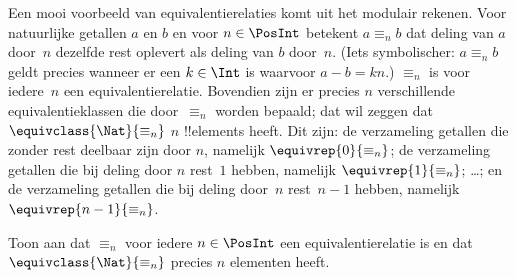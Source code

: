 \documentclass[../../../include/open-logic-section]{subfiles}
\begin{document}
\begin{ex}
Een mooi voorbeeld van equivalentierelaties komt uit het modulair rekenen.
Voor natuurlijke getallen $a$ en $b$ en voor $n \in \PosInt$ betekent
$a \equiv_n b$ dat
deling van $a$ door~$n$ dezelfde rest oplevert als deling van $b$ door~$n$.
(Iets symbolischer: $a \equiv_n b$ geldt precies wanneer er een $k \in
\Int$ is waarvoor $a - b = kn$.) $\equiv_n$ is voor iedere~$n$ een
equivalentierelatie. Bovendien zijn er precies $n$ verschillende
equivalentieklassen die door~$\equiv_n$ worden bepaald; dat wil zeggen
dat $\equivclass{\Nat}{\equiv_n}$
$n$ !!{element}s heeft. Dit zijn: de verzameling getallen die zonder rest
deelbaar zijn door $n$, namelijk $\equivrep{0}{\equiv_n}$; de verzameling
getallen die bij deling door $n$ rest~$1$ hebben, namelijk
$\equivrep{1}{\equiv_n}$; \ldots; en de verzameling getallen die bij deling
door~$n$ rest~$n-1$ hebben, namelijk~$\equivrep{n-1}{\equiv_n}$.
\end{ex}

\begin{prob}
Toon aan dat $\equiv_n$ voor iedere $n \in \PosInt$ een equivalentierelatie
is en dat $\equivclass{\Nat}{\equiv_n}$ precies $n$ elementen heeft.
\end{prob}
\end{document}
